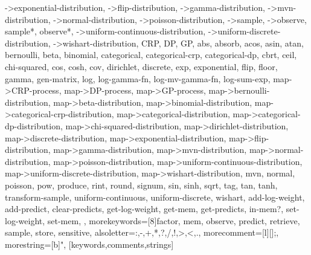 {{    ->exponential-distribution, ->flip-distribution, ->gamma-distribution, %
    ->mvn-distribution, ->normal-distribution, ->poisson-distribution, %
    ->sample, ->observe, sample*, observe*, %
    ->uniform-continuous-distribution, ->uniform-discrete-distribution, %
    ->wishart-distribution, CRP, DP, GP, abs, absorb, acos, asin, atan, %
    bernoulli, beta, binomial, categorical, categorical-crp, categorical-dp, %
    cbrt, ceil, chi-squared, cos, cosh, cov, dirichlet, discrete, exp, %
    exponential, flip, floor, gamma, gen-matrix, log, log-gamma-fn, %
    log-mv-gamma-fn, log-sum-exp, map->CRP-process, map->DP-process, %
    map->GP-process, map->bernoulli-distribution, map->beta-distribution, %
    map->binomial-distribution, map->categorical-crp-distribution, %
    map->categorical-distribution, map->categorical-dp-distribution, %
    map->chi-squared-distribution, map->dirichlet-distribution, %
    map->discrete-distribution, map->exponential-distribution, %
    map->flip-distribution, map->gamma-distribution, map->mvn-distribution, %
    map->normal-distribution, map->poisson-distribution, %
    map->uniform-continuous-distribution, map->uniform-discrete-distribution, %
    map->wishart-distribution, mvn, normal, poisson, pow, produce, %
    rint, round, signum, sin, sinh, sqrt, tag, tan, tanh, transform-sample, %
    uniform-continuous, uniform-discrete, wishart, %
    add-log-weight, add-predict, clear-predicts, get-log-weight, %
    get-mem, get-predicts, in-mem?, set-log-weight, set-mem, %
  }, %
  morekeywords=[8]{factor, mem, observe, predict, retrieve, sample, store}, %
  sensitive, %
  alsoletter={:,-,+,*,?,/,!,>,<,.}, %
  morecomment=[l][\color{gray}]{;}, %
  morestring=[b]", %
}[keywords,comments,strings]
 

